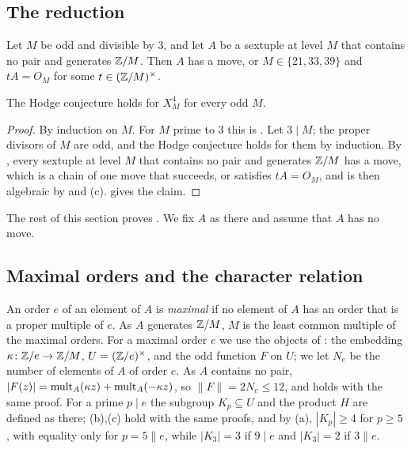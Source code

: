 \subsection{The reduction}

\begin{theorem}\label{thm:moves}
Let $M$ be odd and divisible by $3$, and let $A$ be a sextuple at level $M$
that contains no pair and generates $\mathbb{Z}/M$. Then $A$ has a move, or
$M\in\{21,33,39\}$ and $tA=O_{M}$ for some $t\in(\mathbb{Z}/M)^{\times}$.
\end{theorem}

\begin{corollary}\label{cor:odd}
The Hodge conjecture holds for $X^{4}_{M}$ for every odd $M$.
\end{corollary}

\begin{proof}
By induction on $M$. For $M$ prime to $3$ this is . Let
$3\mid M$; the proper divisors of $M$ are odd, and the Hodge conjecture
holds for them by induction. By , every sextuple at level
$M$ that contains no pair and generates $\mathbb{Z}/M$ has a move, which is a
chain of one move that succeeds, or satisfies $tA=O_{M}$, and is then
algebraic by  and (c).
 gives the claim.
\end{proof}

The rest of this section proves . We fix $A$ as there and
assume that $A$ has no move.

\subsection{Maximal orders and the character relation}
An order $e$ of an element of $A$ is \emph{maximal} if no element of $A$ has
an order that is a proper multiple of $e$. As $A$ generates $\mathbb{Z}/M$, $M$ is
the least common multiple of the maximal orders. For a maximal order $e$ we
use the objects of : the embedding
$\kappa\colon\mathbb{Z}/e\to\mathbb{Z}/M$, $U=(\mathbb{Z}/e)^{\times}$, and the odd function $F$
on $U$; we let $N_{e}$ be the number of elements of $A$ of order $e$. As $A$
contains no pair, $|F(z)|=\operatorname{mult}_{A}(\kappa z)+\operatorname{mult}_{A}(-\kappa z)$, so
$\|F\|=2N_{e}\le12$, and  holds with the same proof. For a
prime $p\mid e$ the subgroup $K_{p}\subseteq U$ and the product $H$ are
defined as there; (b),(c) hold with the same proofs, and by
(a), $|K_{p}|\ge4$ for $p\ge5$, with equality only for
$p=5\parallel e$, while $|K_{3}|=3$ if $9\mid e$ and $|K_{3}|=2$ if
$3\parallel e$.

